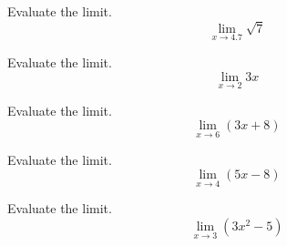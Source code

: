 \documentclass[12pt,addpoints, answers, fleqn]{exam}
\begin{document}
\begin{teacher}
\begin{questions}


\question 	%

Evaluate the limit.
\[
\lim_{x \to 4.7} \sqrt{7}
\]
\begin{solution}
\end{solution}

\question 	%

Evaluate the limit.
\[
\lim_{x \to 2} 3x
\]
\begin{solution}
\end{solution}

\question 	%

Evaluate the limit.
\[
\lim_{x \to 6} \left( 3x+8\right)
\]
\begin{solution}
\end{solution}

\question 	%

Evaluate the limit.
\[
\lim_{x \to 4} \left( 5x - 8\right)
\]
\begin{solution}
\end{solution}

\question 	%

Evaluate the limit.
\[
\lim_{x \to 3} \left( 3x^2 - 5 \right)
\]
\begin{solution}
\end{solution}

\question 	%


\end{questions}
\end{teacher}
\end{document}
